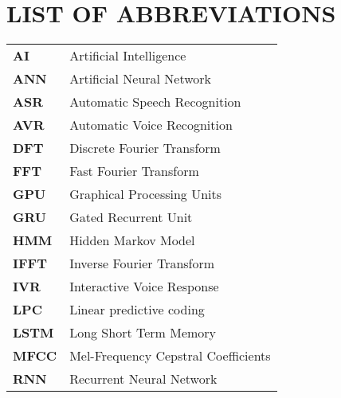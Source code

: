 \section*{LIST OF ABBREVIATIONS}

{
  \renewcommand{\arraystretch}{1.1}

  \begin{tabular}{ll}
    \textbf{AI} & Artificial Intelligence \\
    \textbf{ANN} & Artificial Neural Network \\
	\textbf{ASR} & Automatic Speech Recognition \\
	\textbf{AVR} & Automatic Voice Recognition \\
	\textbf{DFT} & Discrete Fourier Transform \\
	\textbf{FFT} & Fast Fourier Transform \\
	\textbf{GPU} & Graphical Processing Units \\ 
	\textbf{GRU} & Gated Recurrent Unit \\
	\textbf{HMM} & Hidden Markov Model \\   
	\textbf{IFFT} & Inverse Fourier Transform \\
	\textbf{IVR} & Interactive Voice Response \\
	\textbf{LPC} & Linear predictive coding \\
	\textbf{LSTM} & Long Short Term Memory \\
	\textbf{MFCC} & Mel-Frequency Cepstral Coefficients \\	
    \textbf{RNN} & Recurrent Neural Network \\
      
  \end{tabular}
}
